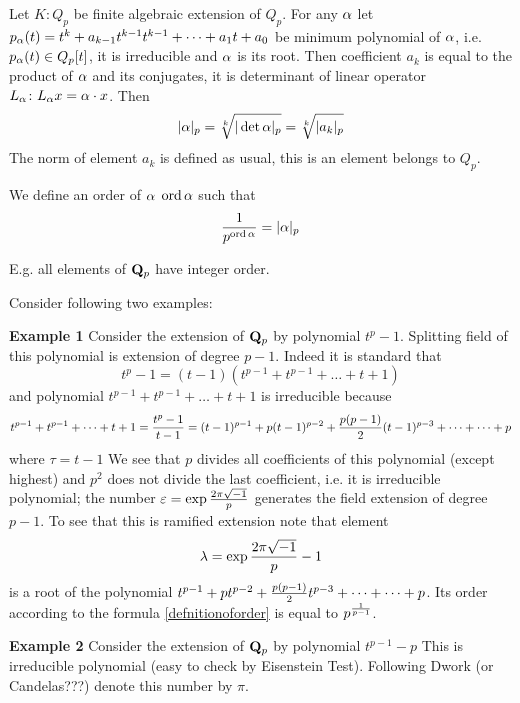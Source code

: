 \documentclass[12pt]{article}
\theoremstyle{theorem}
\numberwithin{equation}{section}
\begin{document}
 Let $K:Q_p$ be finite algebraic extension of $Q_p$. For any $\alpha$
  let $p_\alpha(t)=t^{k}+a_{k-1}t^{k-1} t^{k-1}+\dots+a_1 t+a_0$ be minimum polynomial of $\alpha$, i.e.
  $p_\alpha(t)\in Q_p[t]$, it is irreducible and $\alpha$ is its root. Then
  coefficient $a_k$ is equal to the product of $\alpha$ and its conjugates, it is determinant of
  linear operator $L_\alpha\colon L_\alpha x=\alpha\cdot x$. Then
    \begin{equation}\label{norm}
    |\a|_p=\root k \of {|\det \a|_p}=\root k \of {|a_k|_p}
\end{equation}
The norm of element $a_k$ is defined as usual, this is an element
belongs to $Q_p$.

We define an order of $\alpha$ ${\rm ord\,} \alpha$ such that
\begin{equation}\label{defnitionoforder}
    {1\over p^{{\rm ord\,}\alpha}}=|\alpha|_p
\end{equation}

E.g. all elements of ${\bf Q}_p$ have integer order.

 Consider following two examples:

{\bf Example 1} Consider the extension of ${\bf Q}_p$ by polynomial $t^p-1$.
  Splitting field of this polynomial is extension of degree $p-1$. Indeed it is standard
  that
           $$
t^p-1=(t-1)(t^{p-1}+t^{p-1}+\dots+t+1)
           $$
  and polynomial $t^{p-1}+t^{p-1}+\dots+t+1$ is irreducible because
\begin{equation}\label{irreducibility}
t^{p-1}+t^{p-1}+\dots+t+1={t^p-1\over t-1}=(t-1)^{p-1}+p(t-1)^{p-2}+{p(p-1)\over2}(t-1)^{p-3}+\dots+\dots+p
\end{equation}
where $\tau=t-1$
We see that $p$ divides all coefficients of this polynomial (except highest) and $p^2$ does not divide the last coefficient,
i.e. it is irreducible polynomial; the number ${\varepsilon}=\exp{2\pi\sqrt{-1}\over p}$ generates the field
extension of degree $p-1$. To see that this is ramified extension note that element
\begin{equation}\label{numberlambda}
    \lambda=\exp{2\pi\sqrt{-1}\over p}-1
\end{equation}
is a root of the polynomial  $t^{p-1}+pt^{p-2}+{p(p-1)\over2}t^{p-3}+\dots+\dots+p$. Its order
according to the formula \eqref{defnitionoforder} is equal to $p^{1\over p-1}$.

\medskip

{\bf Example 2} Consider the extension of ${\bf Q}_p$ by polynomial $t^{p-1}-p$
 This is irreducible polynomial
 (easy to check by Eisenstein Test).
Following Dwork (or Candelas???)
denote this number
 by $\pi$.
\end{document}
